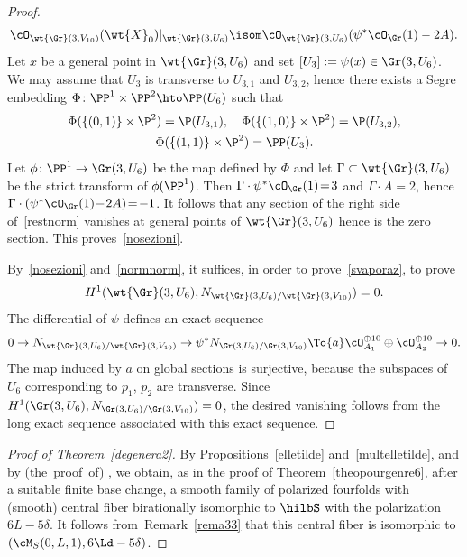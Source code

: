 \begin{proof}
\begin{equation}\label{restnorm}
\cO_{\wt{\Gr}(3,V_{10})}(\wt{X}_0)\vert_{\wt{\Gr}(3,U_6)}\isom \cO_{\wt{\Gr}(3,U_6)}(\psi^{*}\cO_{\Gr}(1)-2A).
\end{equation}
Let $x$ be a general point in $ \wt{\Gr}(3,U_6)$
and set $[U_3]:=\psi(x)\in \Gr(3,U_6)$. We may assume that $U_3$ is transverse to $U_{3,1} $ and $U_{3,2} $, hence there exists a Segre embedding $\Phi\colon\PP^1\times\PP^2\hto\PP(U_6)$ such that\vspace*{-3pt}
\begin{gather*}
\Phi(\{(0,1)\}\times \P^2)=\P(U_{3,1}),\quad
\Phi(\{(1,0)\}\times \P^2)=\P(U_{3,2} ),\\
\Phi(\{(1,1)\}\times \P^2)= \PP(U_3).
\end{gather*}
Let $\phi\colon\PP^1\to\Gr(3,U_6)$ be the map defined by $\Phi$ and let $\Gamma\subset\wt{\Gr}(3,U_6)$ be the strict transform of $\phi(\PP^1)$. Then $\Gamma\cdot\psi^{*}\cO_{\Gr}(1)\!=\!3$ and
$\Gamma\cdot A\!=\!2$, hence \hbox{$\Gamma\cdot(\psi^{*}\cO_{\Gr}(1)\!-\!2A)\!=\!-1$}. It follows that any section of the right side of~\eqref{restnorm} vanishes at general points of $\wt{\Gr}(3,U_6)$ hence is the zero section.
This proves~\eqref{nosezioni}.

By~\eqref{nosezioni} and~\eqref{normnorm}, it suffices, in order to prove~\eqref{svaporaz}, to prove\vspace*{-3pt}
\[
H^1(\wt{\Gr}(3,U_6), N_{\wt{\Gr}(3,U_6)/\wt{\Gr}(3,V_{10})})= 0.
\]
The differential of $\psi$ defines an exact sequence\vspace*{-3pt}
\[
0\to N_{\wt{\Gr}(3,U_6)/\wt{\Gr}(3,V_{10})} \to \psi^{*}N_{\Gr(3,U_6)/\Gr(3,V_{10})} \To{a} \cO^{\oplus 10}_{A_1}\oplus\cO^{\oplus 10}_{A_2} \to 0.
\]
The map induced by $a$ on global sections is surjective, because the subspaces of $U_6$ corresponding to $p_1$, $p_2$ are transverse. Since $H^1(\Gr(3,U_6),N_{\Gr(3,U_6)/\Gr(3,V_{10})})=0$, the desired vanishing follows from the long exact sequence associated with this exact sequence.
\end{proof}

\begin{proof}[Proof of Theorem~\ref{degenera2}]
By Propositions~\ref{elletilde} and~\ref{multelletilde}, and by (the~proof~of) \cite[Th.\,(0.1)]{KLSV}, we obtain, as in the proof of Theorem~\ref{theopourgenre6},
after a suitable finite base change, a smooth family of polarized \hk fourfolds with (smooth) central fiber birationally isomorphic to $\hilbS$ with the polarization $6L-5\delta$. It follows from~Remark~\ref{rema33} that this central fiber is isomorphic to $(\cM_S(0,L,1),6\Ld-5\delta)$.
\end{proof}

